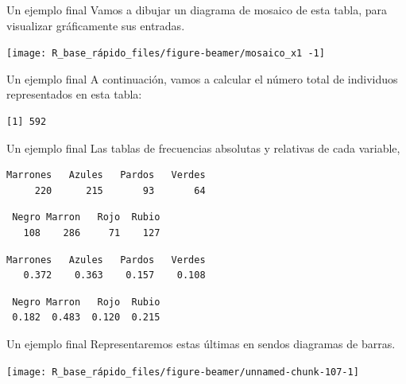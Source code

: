 \documentclass[
  ignorenonframetext,
  aspectratio=169]{beamer}
\begin{document}
\begin{frame}{Un ejemplo final}
\label{un-ejemplo-final-2}
Vamos a dibujar un diagrama de mosaico de esta tabla, para visualizar
gráficamente sus entradas.

\begin{center}\texttt{[image: R\_base\_rápido\_files/figure-beamer/mosaico\_x1 -1]} \end{center}
\end{frame}

\begin{frame}[fragile]{Un ejemplo final}
\label{un-ejemplo-final-3}
A continuación, vamos a calcular el número total de individuos
representados en esta tabla:

\begin{verbatim}
[1] 592
\end{verbatim}
\end{frame}

\begin{frame}[fragile]{Un ejemplo final}
\label{un-ejemplo-final-4}
Las tablas de frecuencias absolutas y relativas de cada variable,

\begin{verbatim}
Marrones   Azules   Pardos   Verdes 
     220      215       93       64 
\end{verbatim}

\begin{verbatim}
 Negro Marron   Rojo  Rubio 
   108    286     71    127 
\end{verbatim}

\begin{verbatim}
Marrones   Azules   Pardos   Verdes 
   0.372    0.363    0.157    0.108 
\end{verbatim}

\begin{verbatim}
 Negro Marron   Rojo  Rubio 
 0.182  0.483  0.120  0.215 
\end{verbatim}
\end{frame}

\begin{frame}{Un ejemplo final}
\label{un-ejemplo-final-5}
Representaremos estas últimas en sendos diagramas de barras.

\begin{center}\texttt{[image: R\_base\_rápido\_files/figure-beamer/unnamed-chunk-107-1]} \end{center}
\end{frame}
\end{document}
